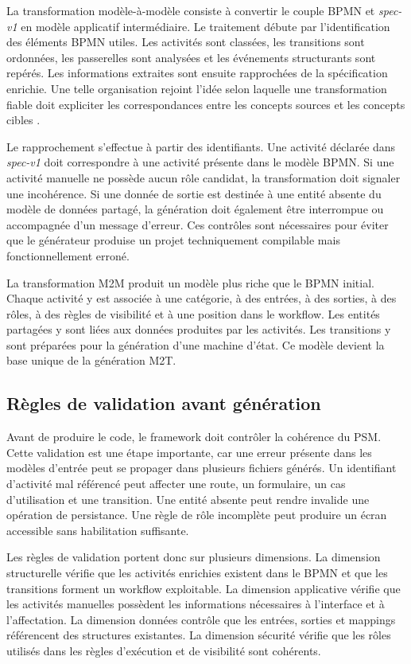 La transformation modèle-à-modèle consiste à convertir le couple BPMN et \textit{spec-v1} en modèle applicatif intermédiaire. Le traitement débute par l'identification des éléments BPMN utiles. Les activités sont classées, les transitions sont ordonnées, les passerelles sont analysées et les événements structurants sont repérés. Les informations extraites sont ensuite rapprochées de la spécification enrichie. Une telle organisation rejoint l'idée selon laquelle une transformation fiable doit expliciter les correspondances entre les concepts sources et les concepts cibles \cite{omgqvt}.

Le rapprochement s'effectue à partir des identifiants. Une activité déclarée dans \textit{spec-v1} doit correspondre à une activité présente dans le modèle BPMN. Si une activité manuelle ne possède aucun rôle candidat, la transformation doit signaler une incohérence. Si une donnée de sortie est destinée à une entité absente du modèle de données partagé, la génération doit également être interrompue ou accompagnée d'un message d'erreur. Ces contrôles sont nécessaires pour éviter que le générateur produise un projet techniquement compilable mais fonctionnellement erroné.

La transformation M2M produit un modèle plus riche que le BPMN initial. Chaque activité y est associée à une catégorie, à des entrées, à des sorties, à des rôles, à des règles de visibilité et à une position dans le workflow. Les entités partagées y sont liées aux données produites par les activités. Les transitions y sont préparées pour la génération d'une machine d'état. Ce modèle devient la base unique de la génération M2T.

\subsection{Règles de validation avant génération}

Avant de produire le code, le framework doit contrôler la cohérence du PSM. Cette validation est une étape importante, car une erreur présente dans les modèles d'entrée peut se propager dans plusieurs fichiers générés. Un identifiant d'activité mal référencé peut affecter une route, un formulaire, un cas d'utilisation et une transition. Une entité absente peut rendre invalide une opération de persistance. Une règle de rôle incomplète peut produire un écran accessible sans habilitation suffisante.

Les règles de validation portent donc sur plusieurs dimensions. La dimension structurelle vérifie que les activités enrichies existent dans le BPMN et que les transitions forment un workflow exploitable. La dimension applicative vérifie que les activités manuelles possèdent les informations nécessaires à l'interface et à l'affectation. La dimension données contrôle que les entrées, sorties et mappings référencent des structures existantes. La dimension sécurité vérifie que les rôles utilisés dans les règles d'exécution et de visibilité sont cohérents.

